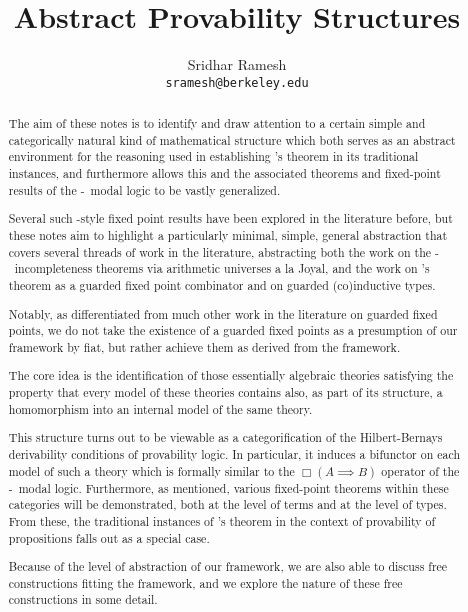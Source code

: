 \documentclass[12pt]{article}
\title{Abstract Provability Structures}
\author{
  Sridhar Ramesh\\
  \texttt{sramesh@berkeley.edu}
}
\begin{document}
\maketitle

\begin{abstract}
The aim of these notes is to identify and draw attention to a certain simple and categorically natural kind of mathematical structure which both serves as an abstract environment for the reasoning used in establishing \Loeb's theorem in its traditional instances, and furthermore allows this and the associated theorems and fixed-point results of the \Goedel-\Loeb\ modal logic to be vastly generalized.

Several such \Loeb-style fixed point results have been explored in the literature before, but these notes aim to highlight a particularly minimal, simple, general abstraction that covers several threads of work in the literature, abstracting both the work on the \Goedel-\Loeb\ incompleteness theorems via arithmetic universes a la Joyal, and the work on \Loeb's theorem as a guarded fixed point combinator and on guarded (co)inductive types.

Notably, as differentiated from much other work in the literature on guarded fixed points, we do not take the existence of a guarded fixed points as a presumption of our framework by fiat, but rather achieve them as derived from the framework.

The core idea is the identification of those essentially algebraic theories satisfying the property that every model of these theories contains also, as part of its structure, a homomorphism into an internal model of the same theory.

This structure turns out to be viewable as a categorification of the Hilbert-Bernays derivability conditions of provability logic. In particular, it induces a bifunctor on each model of such a theory which is formally similar to the $\Box(A \implies B)$ operator of the \Goedel-\Loeb\ modal logic. Furthermore, as mentioned, various fixed-point theorems within these categories will be demonstrated, both at the level of terms and at the level of types. From these, the traditional instances of \Loeb's theorem in the context of provability of propositions falls out as a special case.

Because of the level of abstraction of our framework, we are also able to discuss free constructions fitting the framework, and we explore the nature of these free constructions in some detail.


\end{abstract}
\end{document}
